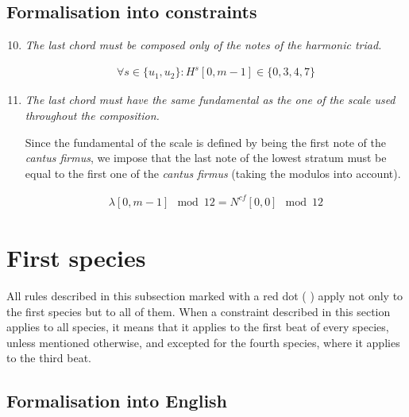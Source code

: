 \subsection{Formalisation into constraints} \label{sec:generalconstraints}
\begin{enumerate}[wide, label=\bfseries G\arabic*]
    \setcounter{enumi}{9} %
    \item \textit{The last chord must be composed only of the notes of the harmonic triad.} \label{constraint:last-chord-h-triad}
    
    \begin{equation} \begin{aligned}
    \forall s \in \{u_1, u_2\} \colon H^{s}[0, m-1] \in \{0, 3, 4, 7\}
    \end{aligned} \end{equation}

    \item \textit{The last chord must have the same fundamental as the one of the scale used throughout the composition.}\label{constraint:same-fundamental}

    Since the fundamental of the scale is defined by being the first note of the \textit{cantus firmus}, we impose that the last note of the lowest stratum must be equal to the first one of the \textit{cantus firmus} (taking the modulos into account).
    
    
    \begin{equation} \begin{aligned}
    \lambda[0, m-1] \mod 12 = N^{cf}[0, 0] \mod 12
    \end{aligned} \end{equation}
\end{enumerate}

\section{First species}
All rules described in this subsection marked with a red dot ( \reddot) apply not only to the first species but to all of them. When a constraint described in this section applies to all species, it means that it applies to the first beat of every species, unless mentioned otherwise, and excepted for the fourth species, where it applies to the third beat.

\subsection{Formalisation into English}
